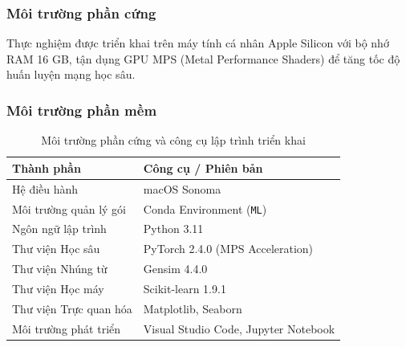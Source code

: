 \documentclass[12pt,a4paper]{article}
\begin{document}
\subsubsection{Môi trường phần cứng}\label{sec:hardware_env}
Thực nghiệm được triển khai trên máy tính cá nhân Apple Silicon với bộ nhớ RAM 16 GB, tận dụng GPU MPS (Metal Performance Shaders) để tăng tốc độ huấn luyện mạng học sâu.

\subsubsection{Môi trường phần mềm}\label{sec:software_env}
\begin{table}[H]
    \centering
    \caption{Môi trường phần cứng và công cụ lập trình triển khai}
    \label{tab:env_stats}
    \renewcommand{\arraystretch}{1.2}
    \begin{tabular}{|>{\raggedright\arraybackslash}p{4.5cm}|>{\raggedright\arraybackslash}p{10.0cm}|}
        \hline
        \textbf{Thành phần} & \textbf{Công cụ / Phiên bản} \\
        \hline
        Hệ điều hành & macOS Sonoma \\
        Môi trường quản lý gói & Conda Environment (\texttt{ML}) \\
        Ngôn ngữ lập trình & Python 3.11 \\
        Thư viện Học sâu & PyTorch 2.4.0 (MPS Acceleration) \\
        Thư viện Nhúng từ & Gensim 4.4.0 \\
        Thư viện Học máy & Scikit-learn 1.9.1 \\
        Thư viện Trực quan hóa & Matplotlib, Seaborn \\
        Môi trường phát triển & Visual Studio Code, Jupyter Notebook \\
        \hline
    \end{tabular}
\end{table}
\end{document}
